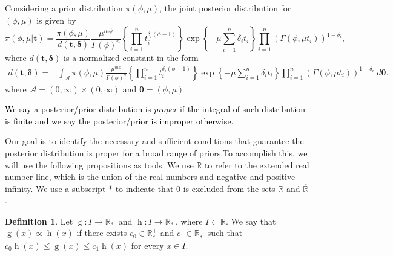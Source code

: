 \documentclass[]{interact}
\newcommand{\f}{\operatorname}
\theoremstyle{plain}%
\theoremstyle{definition}
\newtheorem{definition}[theorem]{Definition}
\theoremstyle{remark}
\begin{document}
Considering a prior distribution $\pi(\phi,\mu)$, the joint posterior distribution for $(\phi,\mu)$ is given by 
\begin{equation}\label{principal}
\pi(\phi,\mu|\boldsymbol{t})=\frac{\pi(\phi,\mu)}{d(\boldsymbol{t,\delta})} \frac{\mu^{m\phi}}{\Gamma(\phi)^n}\left\{\prod_{i=1}^n{t_i^{\delta_i(\phi-1)}}\right\}\exp\left\{-\mu\sum_{i=1}^n {\delta_i}t_i\right\}\prod_{i=1}^n\left(\Gamma(\phi,\mu t_i)\right)^{1-\delta_i},
\end{equation}
where  $d(\boldsymbol{t,\delta})$ is a normalized constant in the form 
\begin{align*}%
d(\boldsymbol{t,\delta})=&\int_{\mathcal{A}} \pi(\phi,\mu)\frac{\mu^{m\phi}}{\Gamma(\phi)^n}\left\{\prod_{i=1}^n{t_i^{\delta_i(\phi-1)}}\right\}\exp\left\{-\mu\sum_{i=1}^n {\delta_i}t_i\right\}\prod_{i=1}^n\left(\Gamma(\phi,\mu t_i)\right)^{1-\delta_i}\; d\boldsymbol{\theta}.
\end{align*}
where $\mathcal{A}=(0,\infty)\times (0,\infty)$ and $\boldsymbol{\theta}=(\phi,\mu)$


\textcolor{black}{We say a posterior/prior distribution is \textit{proper} if the integral of such distribution is finite and we say the posterior/prior is improper otherwise.}

Our goal is to identify the necessary and sufficient conditions that guarantee the posterior distribution is proper for a broad range of priors.To accomplish this, we will use the following propositions as tools. We use $\overline{\mathbb{R}}$ to refer to the extended real number line, which is the union of the real numbers and negative and positive infinity. We use a subscript $*$ to indicate that $0$ is excluded from the sets $\mathbb{R}$ and $\overline{\mathbb{R}}$.

\begin{definition}\label{definition0} Let $\f{g}:I\to\overline{\mathbb{R}}_*^+$ and $\f{h}:I\to\overline{\mathbb{R}}_*^+$, where $I\subset\mathbb{R}$. We say that $\f{g}(x)\propto \f{h}(x)$ if there exists $c_0\in \mathbb{R}^+_*$ and $c_1\in \mathbb{R}^+_*$ such that $c_0\f{h}(x) \leq \f{g}(x) \leq c_1\f{h}(x)$ for every $x\in I$.
\end{definition}
\end{document}
